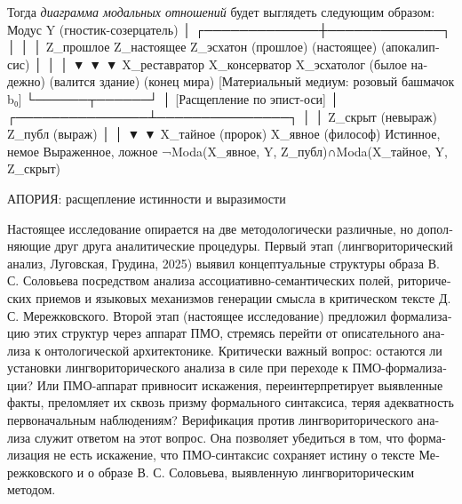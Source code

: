 \begin{russian}
    Тогда \textit{диаграмма модальных отношений} будет выглядеть следующим образом:
    Модус Y (гностик-созерцатель)
                                                        │
                    ┌─────────────┼─────────────┐
                    │                                     │                                      │
                Z_прошлое            Z_настоящее            Z_эсхатон
             (прошлое)          (настоящее)       (апокалипсис)
                │                                        │                                      │
                ▼                                      ▼                                      ▼
          X_реставратор         X_консерватор        X_эсхатолог
       (былое надежно)     (валится здание)   (конец мира)
             [Материальный медиум: розовый башмачок b₀]
                            └──────┬──────┘
                                              │
                        [Расщепление по эпист-оси]
                                              │
                    ┌───────────────┴───────────────┐
                    │                                                     │
                Z_скрыт (невыраж)              Z_публ (выраж)
                    │                                                   │
                    ▼                                                 ▼
             X_тайное (пророк)             X_явное (философ)
             Истинное, немое              Выраженное, ложное
             ¬Moda(X_явное, Y, Z_публ)∩Moda(X_тайное, Y, Z_скрыт)
    {\centering АПОРИЯ: расщепление истинности и выразимости \par}

    Настоящее исследование опирается на две методологически различные, но дополняющие друг друга аналитические процедуры. Первый этап (лингвориторический анализ, Луговская, Грудина, 2025) выявил концептуальные структуры образа В. С. Соловьева посредством анализа ассоциативно-семантических полей, риторических приемов и языковых механизмов генерации смысла в критическом тексте Д. С. Мережковского. Второй этап (настоящее исследование) предложил формализацию этих структур через аппарат ПМО, стремясь перейти от описательного анализа к онтологической архитектонике.
    Критически важный вопрос: остаются ли установки лингвориторического анализа в силе при переходе к ПМО-формализации? Или ПМО-аппарат привносит искажения, переинтерпретирует выявленные факты, преломляет их сквозь призму формального синтаксиса, теряя адекватность первоначальным наблюдениям?
    Верификация против лингвориторического анализа служит ответом на этот вопрос. Она позволяет убедиться в том, что формализация не есть искажение, что ПМО-синтаксис сохраняет истину о тексте Мережковского и о образе В. С. Соловьева, выявленную лингвориторическим методом.


\end{russian}

